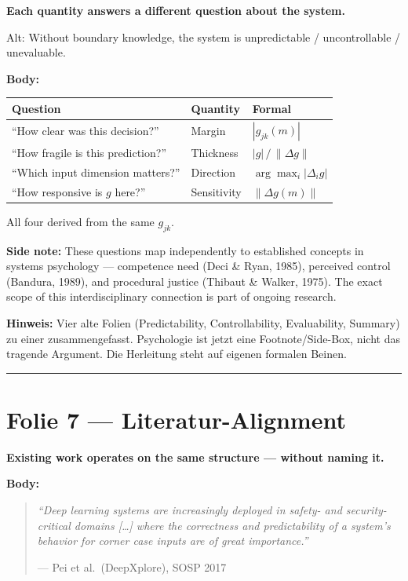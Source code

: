 \documentclass[11pt, a4paper]{article}
\newcommand{\actiontitle}[1]{{\Large\bfseries\color{tumdark} #1}\par\vspace{0.3em}}
\newcommand{\oldtitle}[1]{{\small\color{gray} Alt: #1}\par}
\newcommand{\slidenote}[1]{{\small\color{accent}\textbf{Hinweis:} #1}\par}
\begin{document}
\actiontitle{Each quantity answers a different question about the system.}

\oldtitle{Without boundary knowledge, the system is unpredictable / uncontrollable / unevaluable.}

\textbf{Body:}

\begin{center}
\renewcommand{\arraystretch}{1.6}
\begin{tabular}{lll}
\textbf{Question} & \textbf{Quantity} & \textbf{Formal} \\
\hline
``How clear was this decision?'' & Margin & $|g_{jk}(m)|$ \\
``How fragile is this prediction?'' & Thickness & $|g| \,/\, \|\Delta g\|$ \\
``Which input dimension matters?'' & Direction & $\arg\max_i |\Delta_i g|$ \\
``How responsive is $g$ here?'' & Sensitivity & $\|\Delta g(m)\|$ \\
\end{tabular}
\end{center}

All four derived from the same $g_{jk}$.

\begin{tcolorbox}[colframe=gray, colback=white, fontupper=\small]
\textbf{Side note:} These questions map independently to established concepts in systems psychology --- competence need (Deci \& Ryan, 1985), perceived control (Bandura, 1989), and procedural justice (Thibaut \& Walker, 1975). The exact scope of this interdisciplinary connection is part of ongoing research.
\end{tcolorbox}

\slidenote{Vier alte Folien (Predictability, Controllability, Evaluability, Summary) zu einer zusammengefasst. Psychologie ist jetzt eine Footnote/Side-Box, nicht das tragende Argument. Die Herleitung steht auf eigenen formalen Beinen.}

\bigskip\hrule\bigskip

\section*{Folie 7 --- Literatur-Alignment}

\actiontitle{Existing work operates on the same structure --- without naming it.}

\textbf{Body:}

\begin{quote}
\textit{``Deep learning systems are increasingly deployed in safety- and security-critical domains [\ldots] where the correctness and predictability of a system's behavior for corner case inputs are of great importance.''}

\hfill --- Pei et al.\ (DeepXplore), SOSP 2017
\end{quote}
\end{document}
